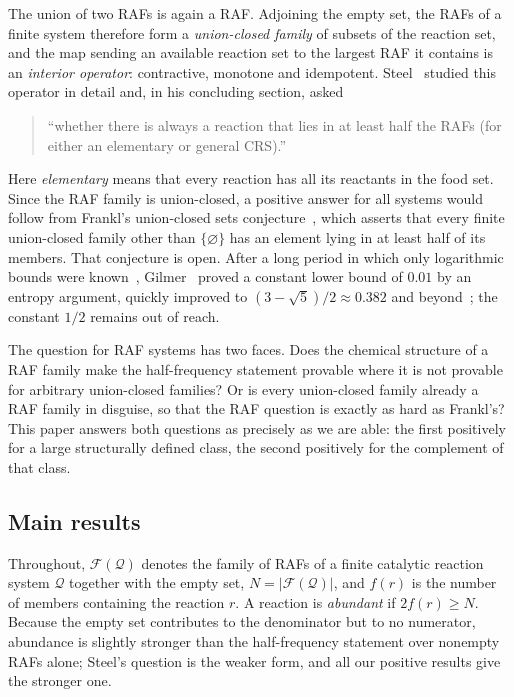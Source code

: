 \documentclass[11pt,a4paper]{article}
\theoremstyle{plain}
\theoremstyle{definition}
\theoremstyle{remark}
\newcommand{\FF}{\mathcal F}
\newcommand{\QQ}{\mathcal Q}
\begin{document}
The union of two RAFs is again a RAF. Adjoining the empty set, the RAFs of a
finite system therefore form a \emph{union-closed family} of subsets of the
reaction set, and the map sending an available reaction set to the largest RAF it
contains is an \emph{interior operator}: contractive, monotone and idempotent.
Steel~\cite{steel2023interior} studied this operator in detail and, in his
concluding section, asked
\begin{quote}
``whether there is always a reaction that lies in at least half the RAFs (for either an elementary or general CRS).''
\end{quote}
Here \emph{elementary} means that every reaction has all its reactants in the food set.
Since the RAF family is union-closed, a positive answer for all systems would follow
from Frankl's union-closed sets conjecture~\cite{frankl1995extremal,bruhn2015journey}, which asserts
that every finite union-closed family other than $\{\varnothing\}$ has an element
lying in at least half of its members. That conjecture is open. After a long period
in which only logarithmic bounds were known~\cite{wojcik1999union}, Gilmer~\cite{gilmer2022constant}
proved a constant lower bound of $0.01$ by an entropy argument, quickly improved to
$(3-\sqrt5)/2\approx0.382$ and beyond~\cite{alweiss2022improved,chase2022approximate,sawin2022improved,cambie2022better};
the constant $1/2$ remains out of reach.

The question for RAF systems has two faces. Does the chemical structure of a RAF family
make the half-frequency statement provable where it is not provable for arbitrary union-closed
families? Or is every union-closed family already a RAF family in disguise, so that the RAF
question is exactly as hard as Frankl's? This paper answers both questions as precisely as
we are able: the first positively for a large structurally defined class, the second positively
for the complement of that class.

\subsection{Main results}

Throughout, $\FF(\QQ)$ denotes the family of RAFs of a finite catalytic reaction system $\QQ$
together with the empty set, $N=|\FF(\QQ)|$, and $f(r)$ is the number of members containing
the reaction $r$. A reaction is \emph{abundant} if $2f(r)\ge N$. Because the empty set
contributes to the denominator but to no numerator, abundance is slightly stronger than the
half-frequency statement over nonempty RAFs alone; Steel's question is the weaker form, and
all our positive results give the stronger one.
\end{document}
